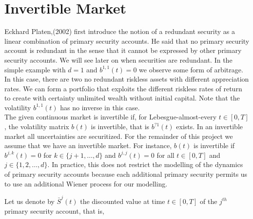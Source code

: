 \documentclass[a4 paper, 12pt]{report}
\theoremstyle{plain}
\begin{document}
\section{Invertible Market}

Eckhard Platen,(2002) first introduce the notion of a redundant security as a linear
combination of primary security accounts. He said that no primary security account is
redundant in the sense that it cannot be expressed by other primary security accounts.
We will see later on when securities are redundant. In the simple example with $d = 1$ and $b^{1,1}(t) = 0$ we observe some form of arbitrage. In this case, there are two no redundant
riskless assets with different appreciation rates. We can form a portfolio that exploits the
different riskless rates of return to create with certainty unlimited wealth without initial
capital. Note that the volatility $b^{1,1}(t)$ has no inverse in this case.\\

The given continuous market is invertible if, for Lebesgue-almost-every $t \in [0,T]$, the
volatility matrix $b(t)$ is invertible, that is $b^{?1}(t)$ exists. In an invertible market all
uncertainties are securitized. For the remainder of this project we assume that we have an
invertible market. For instance, $b(t)$ is invertible if $b^{j,k}(t) = 0$ for $k \in \{j + 1,\ldots,d\}$ and $b^{j,j} (t) =
0$ for all $t \in [0, T ]$ and $j \in \{1, 2,\ldots,d\}$. In practice, this does not restrict the modelling of the
dynamics of primary security accounts because each additional primary security permits
us to use an additional Wiener process for our modelling.\\

\par Let us denote by $\bar{S}^{j} (t)$ the discounted value at time $t \in [0, T]$ of the $j^{th}$ primary security account, that is,
\end{document}
